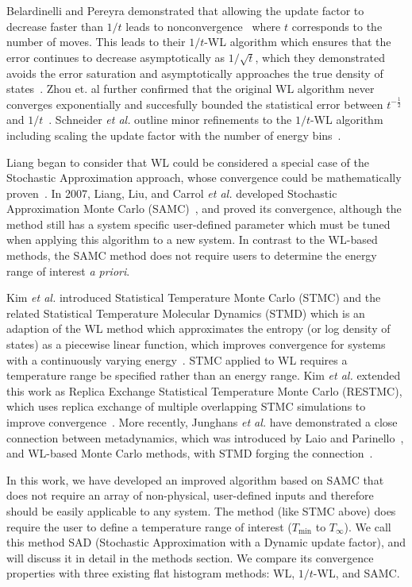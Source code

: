 \documentclass[letterpaper,twocolumn,amsmath,amssymb,pre,aps,10pt]{revtex4-1}
\begin{document}
Belardinelli and Pereyra demonstrated that allowing the update factor to
decrease faster than $1/t$ leads to nonconvergence~\cite{belardinelli2007wang}
where $t$ corresponds to the number of moves.
%
This leads to their $1/t$-WL algorithm which ensures that the error continues to
decrease asymptotically as $1/\sqrt{t}$, which they demonstrated avoids the
error saturation and asymptotically approaches the true density of
states~\cite{belardinelli2008analysis}. Zhou et. al further confirmed that the
original WL algorithm never converges exponentially and succesfully bounded the
statistical error between $t^{-\frac12}$ and $1/t$~\cite{zhou2008optimal}.
Schneider \emph{et al.} outline minor refinements to the $1/t$-WL algorithm
including scaling the update factor with the number of energy
bins~\cite{schneider2017convergence}.

Liang began to consider that WL could be considered a special case of the
Stochastic Approximation approach, whose convergence could be mathematically
proven~\cite{liang2006theory}. In 2007, Liang, Liu, and Carrol \emph{et al.}
developed Stochastic Approximation Monte Carlo
(SAMC)~\cite{liang2007stochastic}, and proved its convergence, although the
method still has a system specific user-defined parameter which must be tuned
when applying this algorithm to a new system.  In
contrast to the WL-based methods, the SAMC method does not require users to
determine the energy range of interest \emph{a priori}.

Kim \emph{et al.} introduced Statistical Temperature Monte Carlo (STMC) and the
related Statistical Temperature Molecular Dynamics (STMD) which is an
adaption of the WL method which approximates the entropy (or log density of
states) as a piecewise linear function, which improves convergence for systems
with a continuously varying energy~\cite{kim2006statistical,
kim2007statistical}. STMC applied to WL requires a temperature range be
specified rather than an energy range.  Kim \emph{et al.} extended this work as
Replica Exchange Statistical Temperature Monte Carlo (RESTMC), which uses
replica exchange of multiple overlapping STMC simulations to improve
convergence~\cite{kim2009replica}. More recently, Junghans \emph{et al.} have
demonstrated a close connection between metadynamics, which was introduced by
Laio and Parinello~\cite{laio2002escaping}, and WL-based Monte Carlo methods,
with STMD forging the connection~\cite{junghans2014molecular}.

In this work, we have developed an improved algorithm based on SAMC that does
not require an array of non-physical, user-defined inputs and therefore should
be easily applicable to any system. The method (like STMC above) does require
the user to define a temperature range of interest ($T_\text{min}$ to
$T_\infty$).  We call this method SAD (Stochastic Approximation with a Dynamic
update factor), and will discuss it in detail in the methods section. We compare
its convergence properties with three existing flat histogram methods: WL,
$1/t$-WL, and SAMC.
\end{document}
